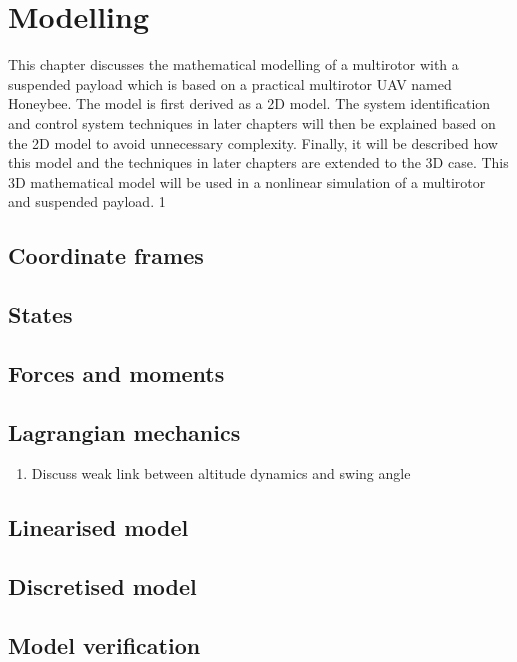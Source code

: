 \graphicspath{{modelling/fig/}}

\chapter{Modelling}
\label{chap:modelling}

This chapter discusses the mathematical modelling of a multirotor with a suspended
payload which is based on a practical multirotor UAV named Honeybee.
The model is first derived as a \gls{2D} model.
The system identification and control system techniques in later chapters will then be explained based on the \gls{2D} model to avoid unnecessary complexity.
Finally, it will be described how this model and the techniques in later chapters are extended to the 3D case.
This 3D mathematical model will be used in a nonlinear simulation of a multirotor and suspended payload.
1
\section{Coordinate frames}
\section{States}
\section{Forces and moments}
\section{Lagrangian mechanics}
    \begin{enumerate}
        \item Discuss weak link between altitude dynamics and swing angle
    \end{enumerate}
\section{Linearised model}
    \label{sec:linear_model}

\section{Discretised model}
\section{Model verification}

    

